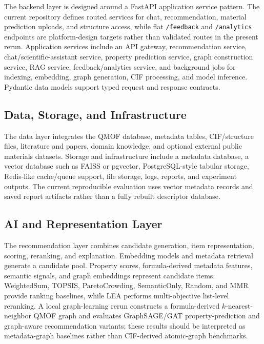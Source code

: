 \documentclass[12pt,a4paper]{article}
\begin{document}
The backend layer is designed around a FastAPI application service pattern. The current repository defines routed services for chat, recommendation, material prediction uploads, and structure access, while flat \texttt{/feedback} and \texttt{/analytics} endpoints are platform-design targets rather than validated routes in the present rerun. Application services include an API gateway, recommendation service, chat/scientific-assistant service, property prediction service, graph construction service, RAG service, feedback/analytics service, and background jobs for indexing, embedding, graph generation, CIF processing, and model inference. Pydantic data models support typed request and response contracts.

\subsection{Data, Storage, and Infrastructure}

The data layer integrates the QMOF database, metadata tables, CIF/structure files, literature and papers, domain knowledge, and optional external public materials datasets. Storage and infrastructure include a metadata database, a vector database such as FAISS or pgvector, PostgreSQL-style tabular storage, Redis-like cache/queue support, file storage, logs, reports, and experiment outputs. The current reproducible evaluation uses vector metadata records and saved report artifacts rather than a fully rebuilt descriptor database.

\subsection{AI and Representation Layer}

The recommendation layer combines candidate generation, item representation, scoring, reranking, and explanation. Embedding models and metadata retrieval generate a candidate pool. Property scores, formula-derived metadata features, semantic signals, and graph embeddings represent candidate items. WeightedSum, TOPSIS, ParetoCrowding, SemanticOnly, Random, and MMR provide ranking baselines, while LEA performs multi-objective list-level reranking. A local graph-learning rerun constructs a formula-derived $k$-nearest-neighbor QMOF graph and evaluates GraphSAGE/GAT property-prediction and graph-aware recommendation variants; these results should be interpreted as metadata-graph baselines rather than CIF-derived atomic-graph benchmarks.
\end{document}
